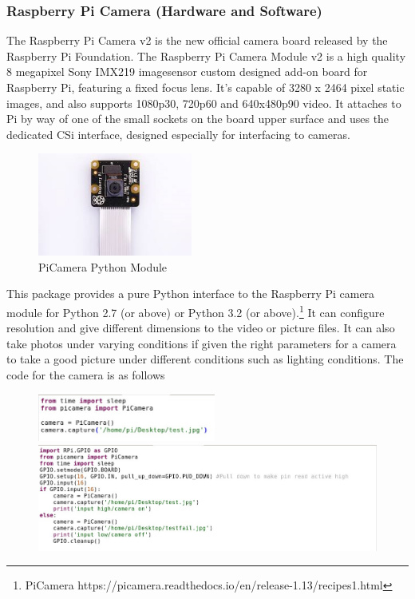 \subsubsection{Raspberry Pi Camera (Hardware and Software)}
\par The Raspberry Pi Camera v2 is the new official camera board released by the Raspberry Pi Foundation. The Raspberry Pi Camera Module v2 is a high quality 8 megapixel Sony IMX219 imagesensor custom designed add-on board for Raspberry Pi, featuring a fixed focus lens. It's capable of 3280 x 2464 pixel static images, and also supports 1080p30, 720p60 and 640x480p90 video. It attaches to Pi by way of one of the small sockets on the board upper surface and uses the dedicated CSi interface, designed especially for interfacing to cameras.
\begin{figure}[h]
	\centering
	\includegraphics[width=2in]{picam.jpg}
	\caption{PiCamera Python Module}
\end{figure}
\par This package provides a pure Python interface to the Raspberry Pi camera module for Python 2.7 (or above) or Python 3.2 (or above).\footnote{PiCamera https://picamera.readthedocs.io/en/release-1.13/recipes1.html} It can configure resolution and give different dimensions to the video or picture files. It can also take photos under varying conditions if given the right parameters for a camera to take a good picture under different conditions such as lighting conditions. 
The code for the camera is as follows
\begin{figure}[h]
	\includegraphics[width=2.3in]{camcode1.jpg}\\
	\includegraphics[width=\textwidth]{camcode2.jpg}
\end{figure}

